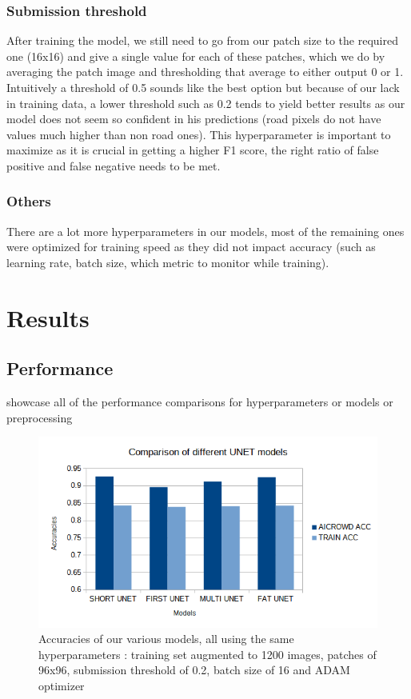 \documentclass[10pt,conference,compsocconf]{IEEEtran}
\begin{document}
\subsubsection{Submission threshold}
After training the model, we still need to go from our patch size to the required one (16x16) and give a single value for each of these patches, which we do by averaging the patch image and thresholding that average to either output 0 or 1. Intuitively a threshold of 0.5 sounds like the best option but because of our lack in training data, a lower threshold such as 0.2 tends to yield better results as our model does not seem so confident in his predictions (road pixels do not have values much higher than non road ones). This hyperparameter is important to maximize as it is crucial in getting a higher F1 score, the right ratio of false positive and false negative needs to be met.
\subsubsection{Others}
There are a lot more hyperparameters in our models, most of the remaining ones were optimized for training speed as they did not impact accuracy (such as learning rate, batch size, which metric to monitor while training).
\section{Results}
\subsection{Performance}
showcase all of the performance comparisons for hyperparameters or models or preprocessing
\begin{figure}[H]
    \centering
    \includegraphics[scale = 0.4]{models_graph.png} %
    \caption{Accuracies of our various models, all using the same hyperparameters : training set augmented to 1200 images, patches of 96x96, submission threshold of 0.2, batch size of 16 and ADAM optimizer}
\end{figure}
\end{document}
